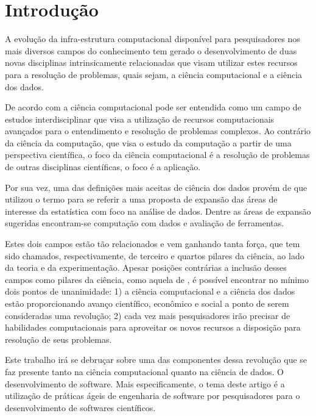 \documentclass[
	article,			%
	11pt,				%
	oneside,			%
	a4paper,			%
	english,			%
	brazil,				%
	sumario=tradicional
	]{abntex2}
\begin{document}
\section*{Introdução}
A evolução da infra-estrutura computacional disponível para pesquisadores nos mais diversos campos do conhecimento tem gerado o desenvolvimento de duas novas disciplinas intrinsicamente relacionadas que visam utilizar estes recursos para a resolução de problemas, quais sejam, a ciência computacional e a ciência dos dados.

De acordo com  a ciência computacional pode ser entendida como um campo de estudos interdisciplinar que visa a utilização de recursos computacionais avançados para o entendimento e resolução de problemas complexos. Ao contrário da ciência da computação, que visa o estudo da computação a partir de uma perspectiva científica, o foco da ciência computacional é a resolução de problemas de outras disciplinas científicas, o foco é a aplicação.

Por sua vez, uma das definições mais aceitas de ciência dos dados provém de  que utilizou o termo para se referir a uma proposta de expansão das áreas de interesse da estatística com foco na análise de dados. Dentre as áreas de expansão sugeridas encontram-se computação com dados e avaliação de ferramentas.


Estes dois campos estão tão relacionados e vem ganhando tanta força, que tem sido chamados, respectivamente, de terceiro e quartos pilares da ciência, ao lado da teoria e da experimentação. Apesar posições contrárias a inclusão desses campos como pilares da ciência, como aquela de , é possível encontrar no mínimo dois pontos de unanimidade: 1) a ciência computacional e a ciência dos dados estão proporcionando avanço científico, econômico e social a ponto de serem consideradas uma revolução; 2) cada vez mais pesquisadores irão precisar de habilidades computacionais para aproveitar os novos recursos a disposição para resolução de seus problemas.


Este trabalho irá se debruçar sobre uma das componentes dessa revolução que se faz presente tanto na ciência computacional quanto na ciência de dados. O desenvolvimento de software. Mais especificamente, o tema deste artigo é a utilização de práticas ágeis de engenharia de software por pesquisadores para o desenvolvimento de softwares científicos.
\end{document}
